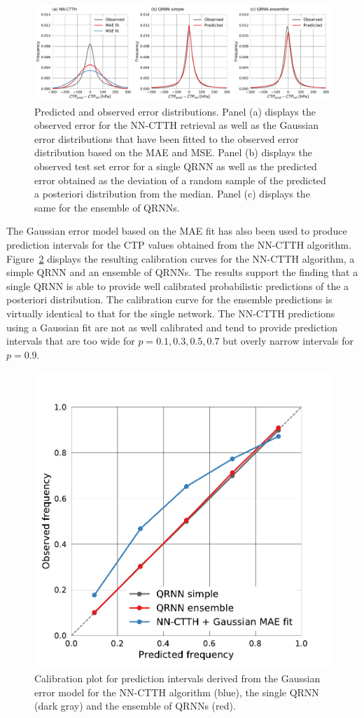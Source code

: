 \documentclass[journal abbreviation, manuscript]{copernicus}
\begin{document}
  \begin{figure}[hbpt!]
    \centering
    \includegraphics[width = 1.0\linewidth]{../plots/fig11.pdf}
    \caption{Predicted and observed error distributions. Panel (a)
      displays the observed error for the NN-CTTH retrieval as well as the
      Gaussian error distributions that have been fitted to the observed
      error distribution based on the MAE and MSE. Panel (b)
      displays the observed test set error for a single QRNN as well as the
      predicted error obtained as the deviation of a random sample of the
      predicted a posteriori distribution from the median. Panel (c) displays
      the same for the ensemble of QRNNs.}
    \label{fig:error_fit}
  \end{figure}

The Gaussian error model based on the MAE fit has also been used to produce
prediction intervals for the CTP values obtained from the NN-CTTH algorithm.
Figure~\ref{fig:calibration} displays the resulting calibration curves for the
NN-CTTH algorithm, a simple QRNN and an ensemble of QRNNs. The results support
the finding that a single QRNN is able to provide well calibrated probabilistic
predictions of the a posteriori distribution. The calibration curve for the
ensemble predictions is virtually identical to that for the single network. The
NN-CTTH predictions using a Gaussian fit are not as well calibrated and tend to
provide prediction intervals that are too wide for $p = 0.1, 0.3, 0.5, 0.7$ but
overly narrow intervals for $p = 0.9$.

  \begin{figure}[hbpt!]
    \centering
    \includegraphics[width = 0.5\linewidth]{../plots/fig12}
    \caption{Calibration plot for prediction intervals derived from the Gaussian
      error model for the NN-CTTH algorithm (blue), the single QRNN (dark gray) and
      the ensemble of QRNNs (red).}
    \label{fig:calibration}
  \end{figure}
\end{document}
